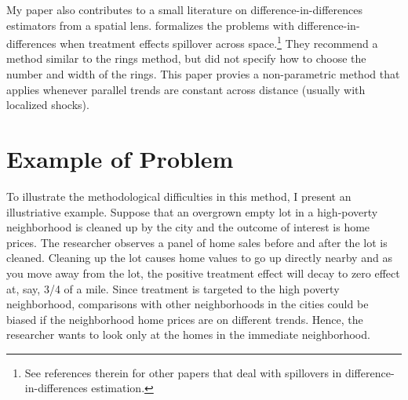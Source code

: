 \documentclass[10pt]{article}
\begin{document}
My paper also contributes to a small literature on difference-in-differences estimators from a spatial lens. \citet{Butts_2021} formalizes the problems with difference-in-differences when treatment effects spillover across space.\footnote{See references therein for other papers that deal with spillovers in difference-in-differences estimation.} They recommend a method similar to the rings method, but did not specify how to choose the number and width of the rings. This paper provies a non-parametric method that applies whenever parallel trends are constant across distance (usually with localized shocks).



\section{Example of Problem}\label{sec:example}

To illustrate the methodological difficulties in this method, I present an illustriative example. Suppose that an overgrown empty lot in a high-poverty neighborhood is cleaned up by the city and the outcome of interest is home prices. The researcher observes a panel of home sales before and after the lot is cleaned. Cleaning up the lot causes home values to go up directly nearby and as you move away from the lot, the positive treatment effect will decay to zero effect at, say, 3/4 of a mile. Since treatment is targeted to the high poverty neighborhood, comparisons with other neighborhoods in the cities could be biased if the neighborhood home prices are on different trends. Hence, the researcher wants to look only at the homes in the immediate neighborhood.

\end{document}
